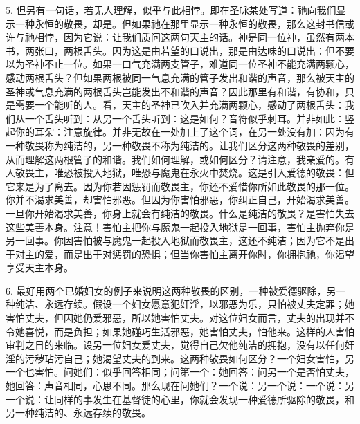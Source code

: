 5. 但另有一句话，若无人理解，似乎与此相悖。即在圣咏某处写道：祂向我们显示一种永恒的敬畏，却是。但如果祂在那里显示一种永恒的敬畏，那么这封书信或许与祂相悖，因为它说：让我们质问这两句天主的话。神是同一位神，虽然有两本书，两张口，两根舌头。因为这是由若望的口说出，那是由达味的口说出：但不要以为圣神不止一位。如果一口气充满两支管子，难道同一位圣神不能充满两颗心，感动两根舌头？但如果两根被同一气息充满的管子发出和谐的声音，那么被天主的圣神或气息充满的两根舌头岂能发出不和谐的声音？因此那里有和谐，有协和，只是需要一个能听的人。看，天主的圣神已吹入并充满两颗心，感动了两根舌头：我们从一个舌头听到：从另一个舌头听到：这是如何？音符似乎刺耳。并非如此：竖起你的耳朵：注意旋律。并非无故在一处加上了这个词，在另一处没有加：因为有一种敬畏称为纯洁的，另一种敬畏不称为纯洁的。让我们区分这两种敬畏的差别，从而理解这两根管子的和谐。我们如何理解，或如何区分？请注意，我亲爱的。有人敬畏主，唯恐被投入地狱，唯恐与魔鬼在永火中焚烧。这是引入爱德的敬畏：但它来是为了离去。因为你若因惩罚而敬畏主，你还不爱惜你所如此敬畏的那一位。你并不渴求美善，却害怕邪恶。但因为你害怕邪恶，你纠正自己，开始渴求美善。一旦你开始渴求美善，你身上就会有纯洁的敬畏。什么是纯洁的敬畏？是害怕失去这些美善本身。注意！害怕主把你与魔鬼一起投入地狱是一回事，害怕主抛弃你是另一回事。你因害怕被与魔鬼一起投入地狱而敬畏主，这还不纯洁；因为它不是出于对主的爱，而是出于对惩罚的恐惧；但当你害怕主离开你时，你拥抱祂，你渴望享受天主本身。\par

6. 最好用两个已婚妇女的例子来说明这两种敬畏的区别，一种被爱德驱除，另一种纯洁、永远存续。假设一个妇女愿意犯奸淫，以邪恶为乐，只怕被丈夫定罪；她害怕丈夫，但因她仍爱邪恶，所以她害怕丈夫。对这位妇女而言，丈夫的出现并不令她喜悦，而是负担；如果她碰巧生活邪恶，她害怕丈夫，怕他来。这样的人害怕审判之日的来临。设另一位妇女爱丈夫，觉得自己欠他纯洁的拥抱，没有以任何奸淫的污秽玷污自己；她渴望丈夫的到来。这两种敬畏如何区分？一个妇女害怕，另一个也害怕。问她们：似乎回答相同；问第一个：她回答：问另一个是否怕丈夫，她回答：声音相同，心思不同。那么现在问她们？一个说：另一个说：一个说：另一个说：让同样的事发生在基督徒的心里，你就会发现一种爱德所驱除的敬畏，和另一种纯洁的、永远存续的敬畏。\par

